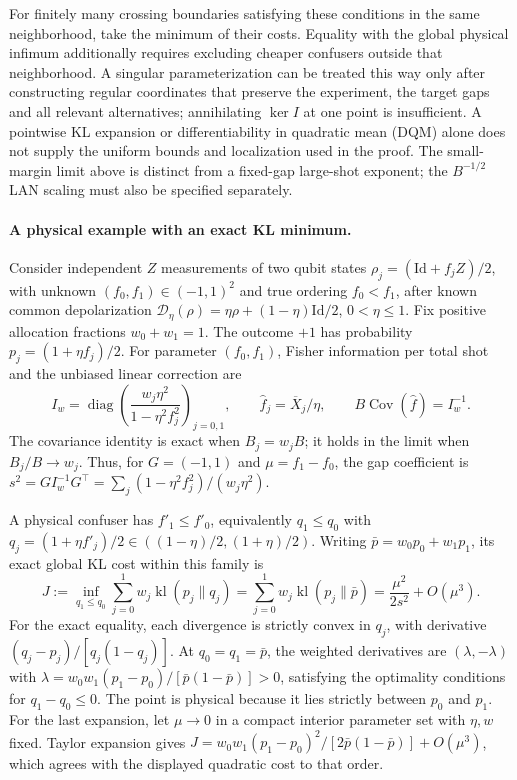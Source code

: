 \documentclass[a4paper,onecolumn,unpublished,nopdfoutputerror]{quantumarticle}
\theoremstyle{plain}
\theoremstyle{definition}
\newcommand{\Cov}{\operatorname{Cov}}
\newcommand{\diag}{\operatorname{diag}}
\newcommand{\1}{\mathbf{1}}
\newcommand{\kl}{\operatorname{kl}}
\begin{document}
For finitely many crossing boundaries satisfying these conditions in the same neighborhood, take the minimum of their costs. Equality with the global physical infimum additionally requires excluding cheaper confusers outside that neighborhood. A singular parameterization can be treated this way only after constructing regular coordinates that preserve the experiment, the target gaps and all relevant alternatives; annihilating $\ker I$ at one point is insufficient. A pointwise KL expansion or differentiability in quadratic mean (DQM) alone does not supply the uniform bounds and localization used in the proof. The small-margin limit above is distinct from a fixed-gap large-shot exponent; the $B^{-1/2}$ LAN scaling must also be specified separately.

\paragraph{A physical example with an exact KL minimum.}
Consider independent $Z$ measurements of two qubit states $\rho_j=(\mathrm{Id}+f_j Z)/2$, with unknown $(f_0,f_1)\in(-1,1)^2$ and true ordering $f_0<f_1$, after known common depolarization $\mathcal D_\eta(\rho)=\eta\rho+(1-\eta)\mathrm{Id}/2$, $0<\eta\le1$. Fix positive allocation fractions $w_0+w_1=1$. The outcome $+1$ has probability $p_j=(1+\eta f_j)/2$. For parameter $(f_0,f_1)$, Fisher information per total shot and the unbiased linear correction are
\[
I_w=\diag\!\left(\frac{w_j\eta^2}{1-\eta^2 f_j^2}\right)_{j=0,1},
\qquad \widehat f_j=\overline X_j/\eta,
\qquad B\Cov(\widehat f)=I_w^{-1}.
\]
The covariance identity is exact when $B_j=w_jB$; it holds in the limit when $B_j/B\to w_j$. Thus, for $G=(-1,1)$ and $\mu=f_1-f_0$, the gap coefficient is $s^2=GI_w^{-1}G^\top=\sum_j(1-\eta^2 f_j^2)/(w_j\eta^2)$.

A physical confuser has $f'_1\le f'_0$, equivalently $q_1\le q_0$ with $q_j=(1+\eta f'_j)/2\in((1-\eta)/2,(1+\eta)/2)$. Writing $\bar p=w_0p_0+w_1p_1$, its exact global KL cost within this family is
\[
J:=\inf_{q_1\le q_0}\sum_{j=0}^1w_j\kl(p_j\|q_j)
=\sum_{j=0}^1w_j\kl(p_j\|\bar p)
=\frac{\mu^2}{2s^2}+O(\mu^3).
\]
For the exact equality, each divergence is strictly convex in $q_j$, with derivative $(q_j-p_j)/[q_j(1-q_j)]$. At $q_0=q_1=\bar p$, the weighted derivatives are $(\lambda,-\lambda)$ with $\lambda=w_0w_1(p_1-p_0)/[\bar p(1-\bar p)]>0$, satisfying the optimality conditions for $q_1-q_0\le0$. The point is physical because it lies strictly between $p_0$ and $p_1$. For the last expansion, let $\mu\to0$ in a compact interior parameter set with $\eta,w$ fixed. Taylor expansion gives $J=w_0w_1(p_1-p_0)^2/[2\bar p(1-\bar p)]+O(\mu^3)$, which agrees with the displayed quadratic cost to that order.
\end{document}
